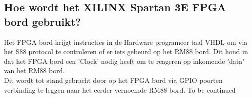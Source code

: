 \subsection{Hoe wordt het XILINX Spartan 3E FPGA bord gebruikt?}
Het FPGA bord krijgt instructies in de Hardware programeer taal VHDL om via het S88 protocol te controleren of er iets gebeurd op het RM88 bord. Dit houd in dat het FPGA bord een 'Clock' nodig heeft om te reageren op inkomende 'data' van het RM88 bord.\\
Dit wordt tot stand gebracht door op het FPGA bord via GPIO poorten verbinding te leggen naar het eerder vernoemde RM88 bord. To be continued